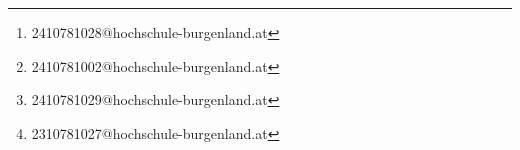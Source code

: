 \author{
	Harald Beier\thanks{2410781028@hochschule-burgenland.at} \and 
	Susanne Peer\thanks{2410781002@hochschule-burgenland.at} \and 
	Patrick Prugger\thanks{2410781029@hochschule-burgenland.at} \and 
	Philipp Palatin\thanks{2310781027@hochschule-burgenland.at}
}

